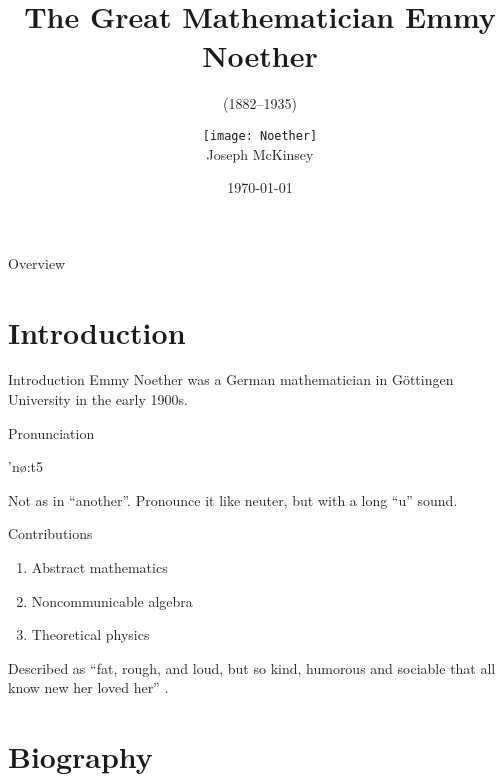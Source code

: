 \documentclass[10pt]{beamer}
\title[Emmy Noether]{The Great Mathematician Emmy Noether}
\subtitle{(1882--1935)}
\author[J. McKinsey]{\texttt{[image: Noether]} \\ \vspace{1em} Joseph
  McKinsey \vspace{-2em}}
\institute[Colorado School of Mines] %
\date{\today}
\begin{document}
\begin{frame}
  \titlepage
\end{frame}

\begin{frame}{Overview}
  \tableofcontents
\end{frame}

\section{Introduction}
\begin{frame}{Introduction}
Emmy Noether was a German mathematician in G\"ottingen University in the early
1900s.

\begin{alertblock}{Pronunciation}
\begin{center} %
\large \begin{IPA}
'n\o:t5
\end{IPA}
\end{center}
Not as in ``another''. Pronounce it like neuter, but with a long ``u'' sound. \cite{wikipedia}
\end{alertblock}

\begin{block}{Contributions}
\begin{enumerate}
\item Abstract mathematics
\item Noncommunicable algebra
\item Theoretical physics
\end{enumerate}
\end{block}

Described as ``fat, rough, and loud, but so kind, humorous and sociable that all
know new her loved her'' \cite{biography}.
\end{frame}


\section{Biography}
\end{document}
